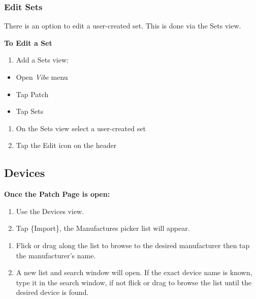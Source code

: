 \documentclass[
]{article}
\providecommand{\tightlist}{%
  \setlength{\itemsep}{0pt}\setlength{\parskip}{0pt}}
\begin{document}
\hypertarget{edit-sets}{%
\subsubsection{Edit Sets}\label{edit-sets}}

There is an option to edit a user-created set. This is done via the Sets view.

\textbf{To Edit a Set}

\begin{enumerate}
\def\labelenumi{\arabic{enumi}.}
\tightlist
\item
  Add a Sets view:
\end{enumerate}

\begin{itemize}
\item
  Open \emph{Vibe} menu
\item
  Tap Patch
\item
  Tap Sets
\end{itemize}

\begin{enumerate}
\def\labelenumi{\arabic{enumi}.}
\setcounter{enumi}{1}
\item
  On the Sets view select a user-created set
\item
  Tap the Edit icon on the header
\end{enumerate}

\hypertarget{Devices-5.2}{%
\subsection{Devices}\label{Devices-5.2}}

\textbf{Once the Patch Page is open:}

\begin{enumerate}
\def\labelenumi{\arabic{enumi}.}
\item
  Use the Devices view.
\item
  Tap \{Import\}, the Manufactures picker list will appear.
\end{enumerate}

\begin{enumerate}
\def\labelenumi{\arabic{enumi}.}
\setcounter{enumi}{2}
\item
  Flick or drag along the list to browse to the desired manufacturer then tap the manufacturer's name.
\item
  A new list and search window will open. If the exact device name is known, type it in the search window, if not flick or drag to browse the list until the desired device is found.
\end{enumerate}
\end{document}
